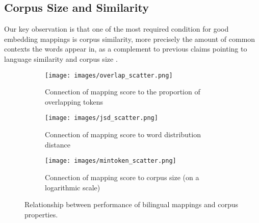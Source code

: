 \documentclass[11pt]{article}
\begin{document}
\subsection{Corpus Size and Similarity}
    Our key observation is that one of the most required condition for good embedding mappings is corpus similarity, more precisely the amount of common contexts the words appear in, as a complement to previous claims pointing to language similarity and corpus size \cite{dubossarsky-etal-2020-secret, vulic-etal-2020-good}.
    
    \begin{figure}[htbp]
         \centering
         \begin{subfigure}[b]{0.52\textwidth}
             \centering
             \texttt{[image: images/overlap\_scatter.png]}
             \caption{Connection of mapping score to the proportion of overlapping tokens}
             \label{fig:three sin x}
         \end{subfigure}
         \hfill
         \begin{subfigure}[b]{0.52\textwidth}
             \centering
             \texttt{[image: images/jsd\_scatter.png]}
             \caption{Connection of mapping score to word distribution distance}
             \label{fig:five over x}
         \end{subfigure}
         \hfill
         \begin{subfigure}[b]{0.52\textwidth}
             \centering
             \texttt{[image: images/mintoken\_scatter.png]}
             \caption{Connection of mapping score to corpus size (on a logarithmic scale)}
             \label{fig:corpsize}
         \end{subfigure}
            \caption{Relationship between performance of bilingual mappings and corpus properties.}
            \label{fig:three graphs}
    \end{figure}
     
    \begin{table}[tbp]
        \caption{Pearson correlation coefficients between P@1 scores and corpus properties.}
        \label{tab:corp}
    \end{table}
\end{document}
